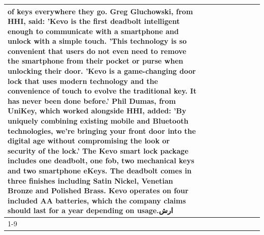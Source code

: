 \begin{table}[H]
\begin{tabular}{lllrlllll}
of keys everywhere they go. Greg Gluchowski, from HHI, said: 'Kevo is the first deadbolt intelligent enough to communicate with a smartphone and unlock with a simple touch. 'This technology is so convenient that users do not even need to remove the smartphone from their pocket or purse when unlocking their door. 'Kevo is a game-changing door lock that uses modern technology and the convenience of touch to evolve the traditional key. It has never been done before.' Phil Dumas, from UniKey, which worked alongside HHI, added: 'By uniquely combining existing mobile and Bluetooth technologies, we’re bringing your front door into the digital age without compromising the look or security of the lock.' The Kevo smart lock package includes one deadbolt, one fob, two mechanical keys and two smartphone eKeys. The deadbolt comes in three finishes including Satin Nickel, Venetian Bronze and Polished Brass. Kevo operates on four included AA batteries, which the company claims should last for a year depending on usage.ارش \\
\cline{1-9}

\end{tabular}
\end{table}
